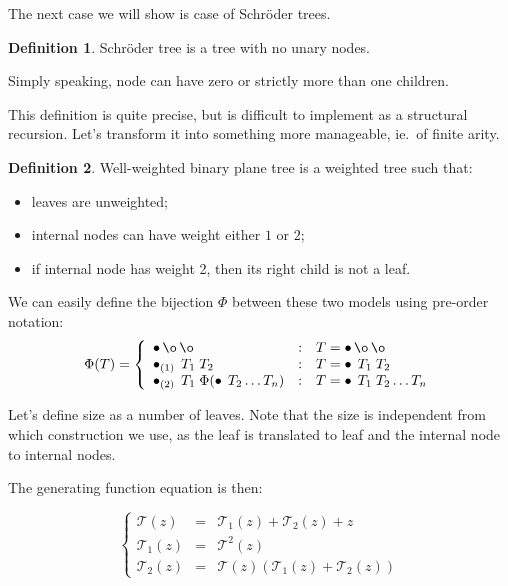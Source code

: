 \documentclass[final]{article}
\theoremstyle{definition}
\newtheorem{definition}{Definition}[subsection]
\theoremstyle{remark}
\newcommand{\gf}[1]{\ensuremath{\mathcal{#1}}}
\newcommand{\weighted}[1]{\ensuremath{_{(#1)}}}
\DeclareMathOperator{\n}{\bullet}
\DeclareMathOperator{\no}{\o}
\begin{document}
The next case we will show is case of Schröder trees\cite{schroder}.

\begin{definition}
    Schröder tree is a tree with no unary nodes.
\end{definition}

Simply speaking, node can have zero or strictly more than one children.


This definition is quite precise, but is difficult to implement as a structural recursion. Let's transform it into something more manageable, ie.~of finite arity.

\begin{definition}
    Well-weighted binary plane tree is a weighted tree such that:
    \begin{itemize}
        \item leaves are unweighted;
        \item internal nodes can have weight either \(1\) or \(2\);
        \item if internal node has weight 2, then its right child is not a leaf.
    \end{itemize}
\end{definition}

We can easily define the bijection \(\Phi\) between these two models using pre-order notation:
\[\Phi(T) = \left\{\begin{array}{lcl}
            \n \no \no &:& T = \n \no \no \\
            \n\weighted{1}\; T_1\; T_2 &:& T = \n\; T_1\; T_2\\
            \n\weighted{2}\; T_1\; \Phi(\n\; T_2 \ldots T_n) &:& T = \n\; T_1\; T_2 \ldots T_n
\end{array}\right.\]

Let's define size as a number of leaves. Note that the size is independent from which construction we use, as the leaf is translated to leaf and the internal node to internal nodes.

The generating function equation is then:

\[\left\{\begin{array}{rcl}
            \gf{T}(z) &=& \gf{T}_1(z) + \gf{T}_2(z) + z\\
            \gf{T}_1(z) &=& \gf{T}^2(z)\\
            \gf{T}_2(z) &=& \gf{T}(z)(\gf{T}_1(z) + \gf{T}_2(z))
\end{array}\right.\]
\end{document}

